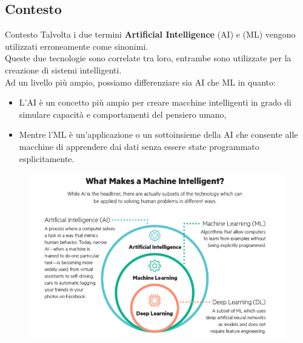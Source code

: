 \subsection[Contesto]{Contesto}
\begin{frame}
	
	\begin{block}{Contesto}
		Talvolta i due termini \textbf{Artificial Intelligence} (AI) e \mlbold (ML) vengono utilizzati erroneamente come sinonimi.\\
		Queste due tecnologie sono correlate tra loro, entrambe sono utilizzate per la creazione di sistemi intelligenti.\\
		Ad un livello più ampio, possiamo differenziare sia AI che ML in quanto:
		\begin{itemize}
			\item L'AI è un concetto più ampio per creare macchine intelligenti in grado di simulare capacità e comportamenti del pensiero umano,
			\item Mentre l'ML è un'applicazione o un sottoinsieme della AI che consente alle macchine di apprendere dai dati senza essere state programmato esplicitamente.
		\end{itemize}
	
	\end{block}
	
\end{frame}


\begin{frame}
		
	\begin{figure}[!htbp]
		\centering
		\includegraphics[width=12.0cm]{images/intro/ai_ml_dl.png}
	\end{figure}
	
\end{frame}



